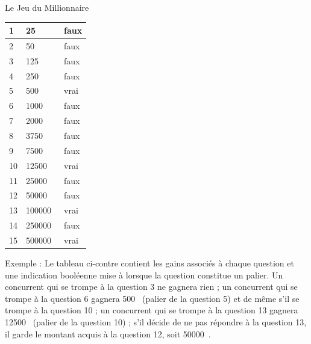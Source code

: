 \begin{Exercice}{Le Jeu du Millionnaire}
	\begin{minipage}[t][][b]{2.5cm}
	\begin{center}
	\begin{footnotesize}
	\begin{tabular}{|l|l|l|}\hline
	  1 &      25~\texteuro & faux \\\hline
	  2 &      50~\texteuro & faux \\\hline
	  3 &     125~\texteuro & faux \\\hline
	  4 &     250~\texteuro & faux \\\hline
	  5 &     500~\texteuro & vrai \\\hline
	  6 &    1000~\texteuro & faux \\\hline
	  7 &    2000~\texteuro & faux \\\hline
	  8 &    3750~\texteuro & faux \\\hline
	  9 &    7500~\texteuro & faux \\\hline
	 10 &   12500~\texteuro & vrai \\\hline
%
	 11 &   25000~\texteuro & faux \\\hline
	 12 &   50000~\texteuro & faux \\\hline
	 13 &  100000~\texteuro & vrai \\\hline
	 14 &  250000~\texteuro & faux \\\hline
	 15 &  500000~\texteuro & vrai \\\hline
	\end{tabular}
	\end{footnotesize}
	\end{center}
	\end{minipage}%
	\hfill
	\begin{minipage}[t][][b]{10cm}
	Exemple : Le tableau ci-contre contient les gains associés à chaque 
	question et une indication booléenne mise à
	 lorsque la question
	constitue un palier. Un concurrent qui se
	trompe à la question 3 ne gagnera rien ; un concurrent qui se trompe à
	la question 6 gagnera 500~\texteuro{} (palier de la question 5) et de même s’il
	se trompe à la question 10 ; un concurrent qui se trompe à la question
	13 gagnera 12500~\texteuro{} (palier de la question 10) ; 
	s'il décide de ne pas répondre à la question 13,
	il garde le montant acquis à la question 12, soit 50000~\texteuro.
	\end{minipage}
	

\end{Exercice}
